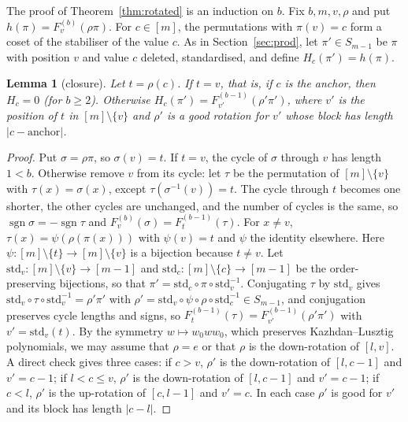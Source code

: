 \documentclass[11pt]{amsart}
\newtheorem{lemma}[theorem]{Lemma}
\theoremstyle{definition}
\theoremstyle{remark}
\newcommand{\sgn}{\operatorname{sgn}}
\begin{document}
The proof of Theorem~\ref{thm:rotated} is an induction on $b$. Fix $b,m,v,\rho$ and put $h(\pi)=F^{(b)}_v(\rho\pi)$. For $c\in[m]$, the permutations with $\pi(v)=c$ form a coset of the stabiliser of the value $c$. As in Section~\ref{sec:prod}, let $\pi'\in S_{m-1}$ be $\pi$ with position $v$ and value $c$ deleted, standardised, and define $H_c(\pi')=h(\pi)$.

\begin{lemma}[closure]\label{lem:closure}
Let $t=\rho(c)$. If $t=v$, that is, if $c$ is the anchor, then $H_c=0$ (for $b\ge2$). Otherwise $H_c(\pi')=F^{(b-1)}_{v'}(\rho'\pi')$, where $v'$ is the position of $t$ in $[m]\setminus\{v\}$ and $\rho'$ is a good rotation for $v'$ whose block has length $|c-\text{anchor}|$.
\end{lemma}

\begin{proof}
Put $\sigma=\rho\pi$, so $\sigma(v)=t$. If $t=v$, the cycle of $\sigma$ through $v$ has length $1<b$. Otherwise remove $v$ from its cycle: let $\tau$ be the permutation of $[m]\setminus\{v\}$ with $\tau(x)=\sigma(x)$, except $\tau(\sigma^{-1}(v))=t$. The cycle through $t$ becomes one shorter, the other cycles are unchanged, and the number of cycles is the same, so $\sgn\sigma=-\sgn\tau$ and $F^{(b)}_v(\sigma)=F^{(b-1)}_t(\tau)$. For $x\ne v$, $\tau(x)=\psi(\rho(\pi(x)))$ with $\psi(v)=t$ and $\psi$ the identity elsewhere. Here $\psi\colon[m]\setminus\{t\}\to[m]\setminus\{v\}$ is a bijection because $t\ne v$. Let $\mathrm{std}_v\colon[m]\setminus\{v\}\to[m-1]$ and $\mathrm{std}_c\colon[m]\setminus\{c\}\to[m-1]$ be the order-preserving bijections, so that $\pi'=\mathrm{std}_c\circ\pi\circ\mathrm{std}_v^{-1}$. Conjugating $\tau$ by $\mathrm{std}_v$ gives $\mathrm{std}_v\circ\tau\circ\mathrm{std}_v^{-1}=\rho'\pi'$ with $\rho'=\mathrm{std}_v\circ\psi\circ\rho\circ\mathrm{std}_c^{-1}\in S_{m-1}$, and conjugation preserves cycle lengths and signs, so $F^{(b-1)}_t(\tau)=F^{(b-1)}_{v'}(\rho'\pi')$ with $v'=\mathrm{std}_v(t)$. By the symmetry $w\mapsto w_0ww_0$, which preserves Kazhdan--Lusztig polynomials, we may assume that $\rho=e$ or that $\rho$ is the down-rotation of $[l,v]$. A direct check gives three cases: if $c>v$, $\rho'$ is the down-rotation of $[l,c-1]$ and $v'=c-1$; if $l<c\le v$, $\rho'$ is the down-rotation of $[l,c-1]$ and $v'=c-1$; if $c<l$, $\rho'$ is the up-rotation of $[c,l-1]$ and $v'=c$. In each case $\rho'$ is good for $v'$ and its block has length $|c-l|$.
\end{proof}
\end{document}
